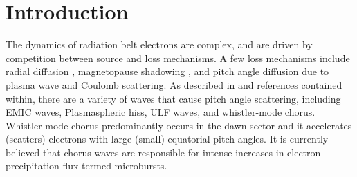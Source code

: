 \documentclass[draft,linenumbers]{agujournal}
\begin{document}
%
%

% 


%
% 
% 
% 

\section{Introduction}\label{Intro}
The dynamics of radiation belt electrons are complex, and are driven by competition between source and loss mechanisms. A few loss mechanisms include radial diffusion \citep{Shprits04}, magnetopause shadowing \citep{Ukhorskiy06}, and pitch angle diffusion \citep{Selesnick03, Abel1998_1} due to plasma wave and Coulomb scattering. As described in \citep{Millan07, Thorne10} and references contained within, there are a variety of waves that cause pitch angle scattering, including EMIC waves, Plasmaspheric hiss, ULF waves, and whistler-mode chorus. Whistler-mode chorus predominantly occurs in the dawn sector \citep{Li09} and it accelerates (scatters) electrons with large (small) equatorial pitch angles\citep{Horne03}. It is currently believed that chorus waves are responsible for intense increases in electron precipitation flux termed microbursts. 
\end{document}
